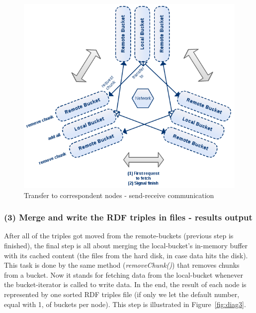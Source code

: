 \begin{figure}
\centering
\includegraphics[scale=0.6]{diag2}
\caption{Transfer to correspondent nodes - send-receive communication}
\label{fig:diag2}
\end{figure}

% 
\subsubsection*{(3) Merge and write the RDF triples in files - results output}

After all of the triples got moved from the remote-buckets (previous step is finished), the final step is all about merging the local-bucket's in-memory buffer with its cached content (the files from the hard disk, in case data hits the disk). This task is done by the same method (\textit{removeChunk()}) that removes chunks from a bucket. Now it stands for fetching data from the local-bucket whenever the bucket-iterator is called to write data. In the end, the result of each node is represented by one sorted RDF triples file (if only we let the default number, equal with 1, of buckets per node). This step is illustrated in Figure~\ref{fig:diag3}.

